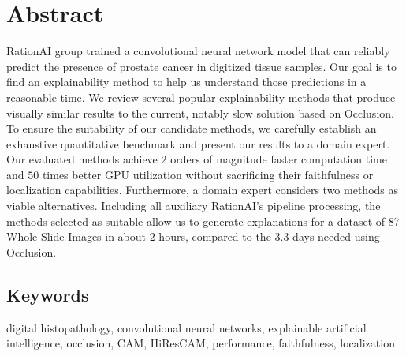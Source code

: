 \chapter*{Abstract}

RationAI group trained a convolutional neural network model that can reliably predict the presence of prostate cancer in digitized tissue samples.
Our goal is to find an explainability method to help us understand those predictions in a reasonable time.
We review several popular explainability methods that produce visually similar results to the current, notably slow solution based on Occlusion.
To ensure the suitability of our candidate methods, we carefully establish an exhaustive quantitative benchmark and present our results to a domain expert.
Our evaluated methods achieve $2$ orders of magnitude faster computation time and $50$ times better GPU utilization without sacrificing their faithfulness or localization capabilities.
Furthermore, a domain expert considers two methods as viable alternatives.
Including all auxiliary RationAI's pipeline processing, the methods selected as suitable allow us to generate explanations for a dataset of 87 Whole Slide Images in about $2$ hours, compared to the $3.3$ days needed using Occlusion.

\section*{Keywords}
digital histopathology, convolutional neural networks, explainable artificial intelligence, occlusion, CAM, HiResCAM, performance, faithfulness, localization
